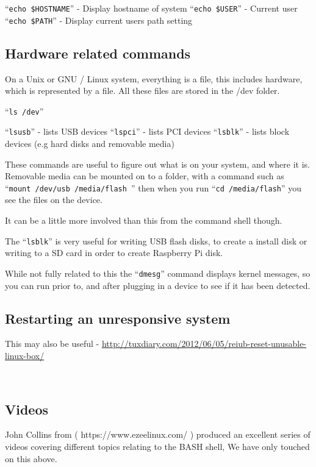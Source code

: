\documentclass{extbook}
\begin{document}
``\verb|echo $HOSTNAME|'' - Display hostname of system
``\verb|echo $USER|'' - Current user
``\verb|echo $PATH|'' - Display current users path setting

\subsection{Hardware related commands}

On a Unix or GNU / Linux system, everything is a file,  this includes hardware, which is represented by a file. All these files are stored in the /dev folder.

``\verb|ls /dev|''

``\verb|lsusb|'' - lists USB devices
``\verb|lspci|'' - lists PCI devices
``\verb|lsblk|'' - lists block devices (e.g hard disks and removable media)

These commands are useful to figure out what is on your system, and where it is. Removable media can be mounted on to a folder, with a command such as ``\verb|mount /dev/usb /media/flash |''  then when you run ``\verb|cd /media/flash|'' you see the files on the device.

It can be a little more involved than this from the command shell though.

The ``\verb|lsblk|'' is very useful for writing USB flash disks, to create a install disk or writing to a SD card in order to create Raspberry Pi disk.

While not fully related to this the ``\verb|dmesg|'' command displays kernel messages,  so you can run prior to, and after plugging in a device to see if it has been detected.

\subsection{Restarting an unresponsive system}

This may also be useful - \url{http://tuxdiary.com/2012/06/05/reiub-reset-unusable-linux-box/}

\



\subsection{Videos}

John Collins from ( https://www.ezeelinux.com/ ) produced an excellent series of videos covering different topics relating to the BASH shell,  We have only touched on this above.
\end{document}

